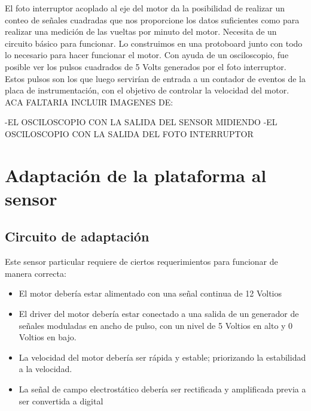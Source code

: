 El foto interruptor acoplado al eje del motor da la posibilidad de realizar un conteo de señales cuadradas que nos proporcione los datos suficientes como para realizar una medición de las vueltas por minuto del motor. Necesita de un circuito básico para funcionar. Lo construimos en una protoboard junto con todo lo necesario para hacer funcionar el motor. Con ayuda de un osciloscopio, fue posible ver los pulsos cuadrados de 5 Volts generados por el foto interruptor. Estos pulsos son los que luego servirían de entrada a un contador de eventos de la placa de instrumentación, con el objetivo de controlar la velocidad del motor. \\

ACA FALTARIA INCLUIR IMAGENES DE:

-EL OSCILOSCOPIO CON LA SALIDA DEL SENSOR MIDIENDO
-EL OSCILOSCOPIO CON LA SALIDA DEL FOTO INTERRUPTOR


\section{Adaptación de la plataforma al sensor} %
\label{it6:sec:adaptacion_de_la_plataforma_al_sensor}

\subsection{Circuito de adaptación} %
\label{it6:sub:circuito_de_adaptacion}


Este sensor particular requiere de ciertos requerimientos para funcionar de manera correcta:

\begin{itemize}
  \item El motor debería estar alimentado con una señal continua de 12 Voltios
  \item El driver del motor debería estar conectado a una salida de un generador de señales moduladas en ancho de pulso, con un nivel de 5 Voltios en alto y 0 Voltios en bajo.
  \item La velocidad del motor debería ser rápida y estable; priorizando la estabilidad a la velocidad.
  \item La señal de campo electrostático debería ser rectificada y amplificada previa a ser convertida a digital
\end{itemize}


